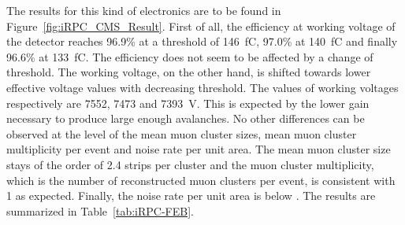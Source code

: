     The results for this kind of electronics are to be found in Figure~\ref{fig:iRPC_CMS_Result}. First of all, the efficiency at working voltage of the detector reaches 96.9\% at a threshold of \SI{146}{fC}, 97.0\% at \SI{140}{fC} and finally 96.6\% at \SI{133}{fC}. The efficiency does not seem to be affected by a change of threshold. The working voltage, on the other hand, is shifted towards lower effective voltage values with decreasing threshold. The values of working voltages respectively are 7552, 7473 and \SI{7393}{V}. This is expected by the lower gain necessary to produce large enough avalanches. No other differences can be observed at the level of the mean muon cluster sizes, mean muon cluster multiplicity per event and noise rate per unit area. The mean muon cluster size stays of the order of 2.4 strips per cluster and the muon cluster multiplicity, which is the number of reconstructed muon clusters per event, is consistent with 1 as expected. Finally, the noise rate per unit area is below . The results are summarized in Table~\ref{tab:iRPC-FEB}.

